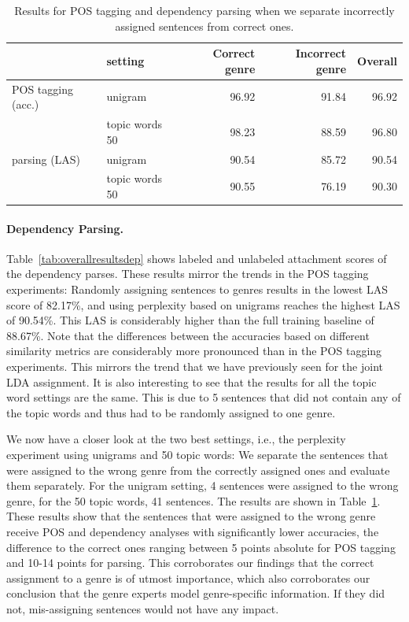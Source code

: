 \begin{table}[t!]
\centering
\begin{tabular}{ll|rrr|}
 & setting & Correct genre & Incorrect genre  & Overall \\ \hline
POS tagging (acc.) & unigram & 96.92 &  91.84 & 96.92\\
&  topic words 50 & 98.23 & 88.59 & 96.80\\
parsing (LAS) & unigram& 90.54& 85.72 & 90.54  \\
& topic words 50 & 90.55 & 76.19 & 90.30\\ \hline
\end{tabular}
\caption{Results for POS tagging and dependency parsing when we separate incorrectly assigned sentences from correct ones.}
\label{tab:comp}
\end{table}



\paragraph{Dependency Parsing.}
Table~\ref{tab:overallresultsdep} shows labeled and unlabeled attachment scores of the dependency parses. These results mirror the trends in the POS tagging experiments: Randomly assigning sentences to genres results in the lowest LAS score of 82.17\%, and using perplexity based on unigrams reaches the highest LAS of 90.54\%. This LAS is considerably higher than the full training baseline of 88.67\%. Note that the differences between the accuracies based on different similarity metrics are considerably more pronounced than in the POS tagging experiments. This mirrors the trend that we have previously seen for the joint LDA assignment. It is also interesting to see that the results for all the topic word settings are the same. This is due to 5 sentences that did not contain any of the topic words and thus had to be randomly assigned to one genre. 

We now have a closer look at the two best settings, i.e., the perplexity experiment using unigrams and 50 topic words: We separate the sentences that were assigned to the wrong genre from the correctly assigned ones and evaluate them separately. For the unigram setting, 4 sentences were assigned to the wrong genre, for the 50 topic words, 41 sentences. The results are shown in Table~\ref{tab:comp}.  These results show that the sentences that were assigned to the wrong genre receive POS and dependency analyses with significantly lower accuracies, the difference to the correct ones ranging between 5 points absolute for POS tagging and 10-14 points for parsing. This corroborates our findings that the correct assignment to a genre is of utmost importance, which also corroborates our conclusion that the genre experts model genre-specific information. If they did not, mis-assigning sentences would not have any impact.

